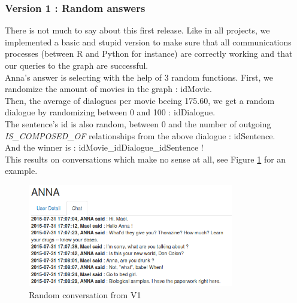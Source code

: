 \subsubsection{Version 1 : Random answers}
\label{sssec:v_rand}
There is not much to say about this first release. Like in all projects, we implemented a basic and stupid version to make sure that all communications processes (between R and Python for instance) are correctly working and that our queries to the graph are successful.\\
Anna's answer is selecting with the help of 3 random functions. First, we randomize the amount of movies in the graph : idMovie.\\
Then, the average of dialogues per movie beeing 175.60, we get a random dialogue by randomizing between 0 and 100 : idDialogue.\\
The sentence's id is also random, between 0 and the number of outgoing \textit{IS\_COMPOSED\_OF} relationships from the above dialogue : idSentence.\\
And the winner is : idMovie\_idDialogue\_idSentence !\\
This results on conversations which make no sense at all, see Figure \ref{fig:convRandom} for an example.\\
\begin{figure}[!h]
\begin{center}
\includegraphics[width=0.80\textwidth]{./img/convRandom.png}
\end{center}
\caption{Random conversation from V1}
\label{fig:convRandom}
\end{figure}
